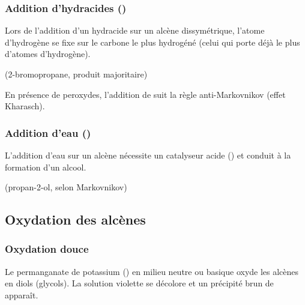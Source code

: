 \subsubsection{Addition d'hydracides ()}

\begin{loi}
Lors de l'addition d'un hydracide  sur un alcène dissymétrique, l'atome d'hydrogène se fixe sur le carbone le plus hydrogéné (celui qui porte déjà le plus d'atomes d'hydrogène).
\end{loi}

\begin{exemple}
 (2-bromopropane, produit majoritaire)
\end{exemple}

\begin{remarque}
En présence de peroxydes, l'addition de  suit la règle anti-Markovnikov (effet Kharasch).
\end{remarque}

\subsubsection{Addition d'eau ()}

\begin{experience}
L'addition d'eau sur un alcène nécessite un catalyseur acide () et conduit à la formation d'un alcool.
\end{experience}

\begin{exemple}
 (propan-2-ol, selon Markovnikov)
\end{exemple}

\subsection{Oxydation des alcènes}

\subsubsection{Oxydation douce}

\begin{experience}
Le permanganate de potassium () en milieu neutre ou basique oxyde les alcènes en diols (glycols). La solution violette se décolore et un précipité brun de  apparaît.
\end{experience}

